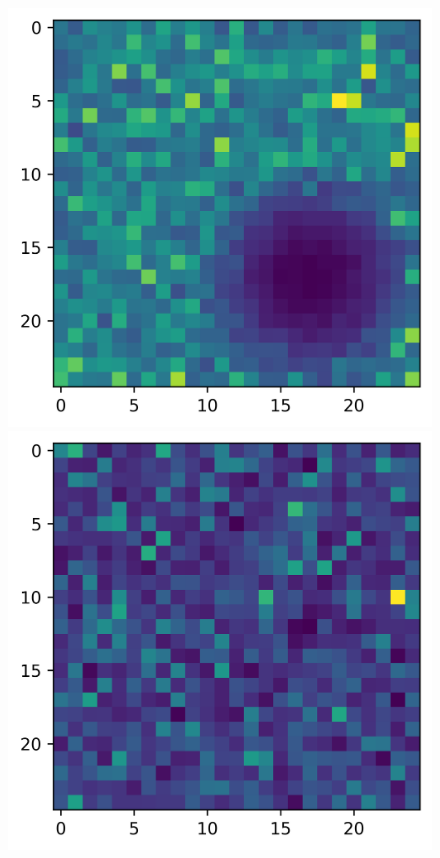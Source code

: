 \begin{figure}\label{fig:dst-gaussian-example}
\begin{multicols}{2}
    \includegraphics[width=\linewidth]{Graphics/gaussian-example-aproximation-dst.png}\par 
    \includegraphics[width=\linewidth]{Graphics/gaussian-example-horizontal-dst.png}\par 

\end{multicols}
\end{figure}
